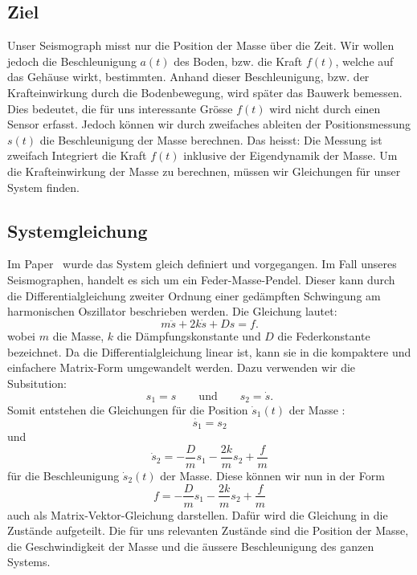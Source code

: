 \subsection{Ziel}
Unser Seismograph misst nur die Position der Masse über die Zeit. 
Wir wollen jedoch die Beschleunigung $a(t)$ des Boden, bzw. die Kraft $f(t)$, welche auf das Gehäuse wirkt, bestimmten.  
Anhand dieser Beschleunigung, bzw. der Krafteinwirkung durch die Bodenbewegung, wird später das Bauwerk bemessen.
Dies bedeutet, die für uns interessante Grösse $f(t)$ wird nicht durch einen Sensor erfasst. 
Jedoch können wir durch zweifaches ableiten der Positionsmessung $s(t)$ die Beschleunigung der Masse berechnen. 
Das heisst: Die Messung ist zweifach Integriert die Kraft $f(t)$ inklusive der Eigendynamik der Masse.
Um die Krafteinwirkung der Masse zu berechnen, müssen wir Gleichungen für unser System finden.

\subsection{Systemgleichung}
Im Paper~\cite{erdbeben:mendezmueller} wurde das System gleich definiert und vorgegangen. 
Im Fall unseres Seismographen, handelt es sich um ein Feder-Masse-Pendel.
Dieser kann durch die Differentialgleichung zweiter Ordnung einer gedämpften Schwingung am harmonischen Oszillator beschrieben werden. 
Die Gleichung lautet:
\begin{equation}
m\ddot s + 2k \dot s + Ds = f.
\end{equation}
wobei $m$ die Masse, $k$ die Dämpfungskonstante und $D$ die Federkonstante bezeichnet.
Da die Differentialgleichung linear ist, kann sie in die kompaktere und einfachere Matrix-Form umgewandelt werden.
Dazu verwenden wir die Subsitution:
\[ 
s_1 = s 
\qquad \text{und} \qquad
s_2 = \dot s
.
\]
Somit entstehen die Gleichungen für die Position $ \dot s_1(t)$ der Masse :
\[ \dot {s_1} = {s_2}\] 
und
\[ \dot s_2 = -\frac{D}{m} {s_1} -\frac{2k}{m} {s_2} + \frac{f} {m} \] 
für die Beschleunigung $\dot s_2(t)$ der Masse.
Diese können wir nun in der Form
\[ f =-\frac{D}{m} {s_1} -\frac{2k}{m} {s_2} + \frac{f} {m} \]
auch als Matrix-Vektor-Gleichung darstellen.
Dafür wird die Gleichung in die Zustände aufgeteilt. 
Die für uns relevanten Zustände sind die Position der Masse, die Geschwindigkeit der Masse und die äussere Beschleunigung des ganzen Systems. 

